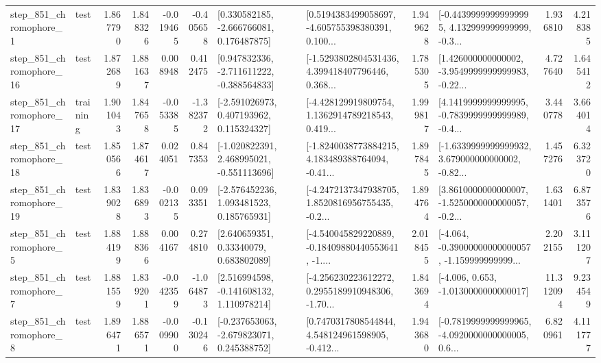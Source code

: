 \begin{tabular}{llrrrrllrlrr}
   step\_851\_chromophore\_1 &      test &      1.867790 &    1.848326 &     -0.019465 & -0.405658 &    [0.330582185, -2.666766081, 0.176487875] &  [0.5194383499058697, -4.605755398380391, 0.100... &       1.949628 &  [-0.44399999999999995, 4.132999999999999, -0.3... &            1.936810 &          4.218385 \\
  step\_851\_chromophore\_16 &      test &      1.872689 &    1.881637 &      0.008948 &  0.412475 &   [0.947832336, -2.711611222, -0.388564833] &  [-1.5293802804531436, 4.399418407796446, 0.368... &       1.785305 &  [1.426000000000002, -3.9549999999999983, -0.22... &            4.727640 &          1.645412 \\
  step\_851\_chromophore\_17 &  training &      1.901043 &    1.847658 &     -0.053385 & -1.382372 &    [-2.591026973, 0.407193962, 0.115324327] &  [-4.428129919809754, 1.1362914789218543, 0.419... &       1.999817 &  [4.1419999999999995, -0.7839999999999989, -0.4... &            3.440778 &          3.664014 \\
  step\_851\_chromophore\_18 &      test &      1.850566 &    1.874617 &      0.024051 &  0.847353 &   [-1.020822391, 2.468995021, -0.551113696] &  [-1.8240038773884215, 4.183489388764094, -0.41... &       1.897845 &  [-1.6339999999999932, 3.679000000000002, -0.82... &            1.457276 &          6.323720 \\
  step\_851\_chromophore\_19 &      test &      1.839028 &    1.836893 &     -0.002135 &  0.093351 &    [-2.576452236, 1.093481523, 0.185765931] &  [-4.2472137347938705, 1.8520816956755435, -0.2... &       1.894764 &  [3.8610000000000007, -1.5250000000000057, -0.2... &            1.631401 &          6.873576 \\
   step\_851\_chromophore\_5 &      test &      1.884199 &    1.888366 &      0.004167 &  0.274810 &      [2.640659351, 0.33340079, 0.683802089] &  [-4.540045829220889, -0.18409880440553641, -1.... &       2.018455 &  [-4.064, -0.39000000000000057, -1.159999999999... &            2.202155 &          3.111207 \\
   step\_851\_chromophore\_7 &      test &      1.881559 &    1.839201 &     -0.042359 & -1.064873 &    [2.516994598, -0.141608132, 1.110978214] &  [-4.256230223612272, 0.2955189910948306, -1.70... &       1.843694 &               [-4.006, 0.653, -1.0130000000000017] &           11.312094 &          9.234549 \\
   step\_851\_chromophore\_8 &      test &      1.896471 &    1.886571 &     -0.009900 & -0.130246 &   [-0.237653063, -2.679823071, 0.245388752] &  [0.7470317808544844, 4.548124961598905, -0.412... &       1.943680 &  [-0.7819999999999965, -4.0920000000000005, 0.6... &            6.820961 &          4.111777 \\

\end{tabular}
